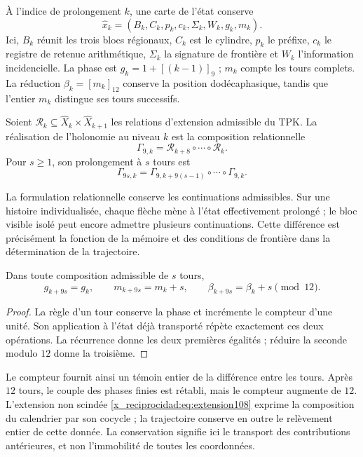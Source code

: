 À l'indice de prolongement \(k\), une carte de l'état conserve
\[
 \widehat x_k=(B_k,C_k,p_k,c_k,\Sigma_k,W_k,g_k,m_k).
\]
Ici, \(B_k\) réunit les trois blocs régionaux, \(C_k\) est le cylindre,
\(p_k\) le préfixe, \(c_k\) le registre de retenue arithmétique, \(\Sigma_k\) la signature
de frontière et \(W_k\) l'information incidencielle. La phase est
\(g_k=1+[(k-1)]_9\) ; \(m_k\) compte les tours complets. La réduction
\(\beta_k=[m_k]_{12}\) conserve la position dodécaphasique, tandis que
l'entier \(m_k\) distingue ses tours successifs.

\begin{definition}
\label{x_reciprocidad:mono-ampl:def-vuelta}
Soient \(\mathcal R_k\subseteq\widehat X_k\times\widehat X_{k+1}\)
les relations d'extension admissible du TPK. La réalisation de
l'holonomie au niveau \(k\) est la composition relationnelle
\[
 \Gamma_{9,k}=\mathcal R_{k+8}\circ\cdots\circ\mathcal R_k.
\]
Pour \(s\geq1\), son prolongement à \(s\) tours est
\[
 \Gamma_{9s,k}=
 \Gamma_{9,k+9(s-1)}\circ\cdots\circ\Gamma_{9,k}.
\]
\end{definition}

La formulation relationnelle conserve les continuations admissibles. Sur
une histoire individualisée, chaque flèche mène à l'état effectivement
prolongé ; le bloc visible isolé peut encore admettre plusieurs
continuations. Cette différence est précisément la fonction de la mémoire et
des conditions de frontière dans la détermination de la trajectoire.

\begin{proposition}
\label{x_reciprocidad:mono-ampl:vueltas}
Dans toute composition admissible de \(s\) tours,
\[
 g_{k+9s}=g_k,\qquad m_{k+9s}=m_k+s,\qquad
 \beta_{k+9s}=\beta_k+s\pmod{12}.
\]
\end{proposition}
\begin{proof}
La règle d'un tour conserve la phase et incrémente le compteur d'une
unité. Son application à l'état déjà transporté répète exactement ces
deux opérations. La récurrence donne les deux premières égalités ; réduire la
seconde modulo \(12\) donne la troisième.
\end{proof}

Le compteur fournit ainsi un témoin entier de la différence entre les
tours. Après \(12\) tours, le couple des phases finies est rétabli, mais
le compteur augmente de \(12\). L'extension non scindée
\eqref{x_reciprocidad:eq:extension108} exprime la composition du calendrier par son
cocycle ; la trajectoire conserve en outre le relèvement entier de cette donnée.
La conservation signifie ici le transport des contributions antérieures,
et non l'immobilité de toutes les coordonnées.

